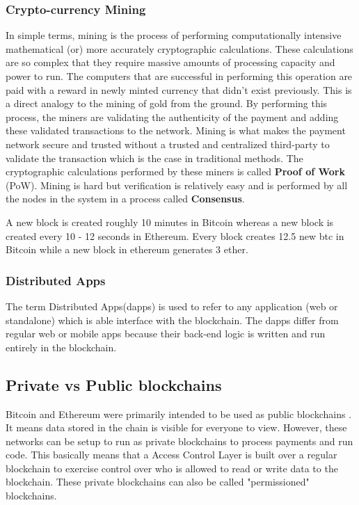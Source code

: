 \documentclass[11pt,openright]{report}
\begin{document}
\subsubsection{Crypto-currency Mining}\label{crypto-mining}
In simple terms, mining is the process of performing computationally intensive mathematical (or) more accurately cryptographic calculations. These calculations are so complex that they require massive amounts of processing capacity and power to run. The computers that are successful in performing this operation are paid with a reward in newly minted currency that didn't exist previously. This is a direct analogy to the mining of gold from the ground. By performing this process, the miners are validating the authenticity of the payment and adding these validated transactions to the network. Mining is what makes the payment network secure and trusted without a trusted and centralized third-party to validate the transaction which is the case in traditional methods. The cryptographic calculations performed by these miners is called \textbf{Proof of Work} (PoW). Mining is hard but verification is relatively easy and is performed by all the nodes in the system in a process called \textbf{Consensus}.

A new block is created roughly 10 minutes in Bitcoin whereas a new block is created every 10 - 12 seconds in Ethereum. Every block creates 12.5 new btc in Bitcoin while a new block in ethereum generates 3 ether.

\subsubsection{Distributed Apps}
The term Distributed Apps(dapps) is used to refer to any application (web or standalone) which is able interface with the blockchain. 
The dapps differ from regular web or mobile apps because their back-end logic is written and run entirely in the blockchain.

\subsection{Private vs Public blockchains}
Bitcoin and Ethereum were primarily intended to be used as public blockchains \cite{privpubarticle}. It means data stored in the chain is visible for everyone to view. However, these networks can be setup to run as private blockchains to process payments and run code. This basically means that a Access Control Layer is built over a regular blockchain to exercise control over who is allowed to read or write data to the blockchain. These private blockchains can also be called "permissioned" blockchains.
\end{document}
